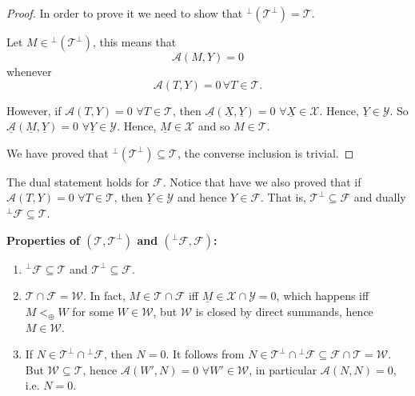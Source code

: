 \begin{proof}
  In order to prove it we need to show that $^\perp(\mathcal{T}^\perp) = \mathcal{T}$.

  Let $M\in {^\perp(\mathcal{T}^\perp)}$, this means that
  \begin{equation}
    \mathcal{A}(M,Y) = 0
  \end{equation}
  whenever
  \begin{equation}
    \mathcal{A}(T,Y) = 0\,\forall T\in\mathcal{T}.
  \end{equation}

  However, if $\mathcal{A}(T,Y)=0$ $\forall T\in\mathcal{T}$, then $\underline{\mathcal{A}}(\underline{X},\underline{Y})=0$ $\forall \underline{X}\in\mathcal{X}$. Hence, $\underline{Y}\in\mathcal{Y}$.
  So $\underline{\mathcal{A}}(\underline{M},\underline{Y})=0$ $\forall \underline{Y}\in\mathcal{Y}$. Hence, $\underline{M}\in\mathcal{X}$ and so $M\in\mathcal{T}$.

  We have proved that $^\perp(\mathcal{T}^\perp) \subseteq \mathcal{T}$, the converse inclusion is trivial.
\end{proof}

\begin{rmk}
  The dual statement holds for $\mathcal{F}$. Notice that have we also proved that if $\mathcal{A}(T,Y)=0$ $\forall T\in\mathcal{T}$, then $\underline{Y}\in\mathcal{Y}$ and hence $Y\in\mathcal{F}$. That is, $\mathcal{T}^\perp \subseteq \mathcal{F}$ and dually $^\perp\mathcal{F}\subseteq \mathcal{T}$.
\end{rmk}

\sepline

\bf Properties of $(\mathcal{T},\mathcal{T}^\perp)$ and $(^\perp\mathcal{F},\mathcal{F})$: \rm
\begin{enumerate}
  \item $^\perp\mathcal{F}\subseteq\mathcal{T}$ and $\mathcal{T}^\perp\subseteq \mathcal{F}$.
  \item $\mathcal{T}\cap\mathcal{F} = \mathcal{W}$.
  In fact, $M\in\mathcal{T}\cap\mathcal{F}$ iff $\underline{M}\in\mathcal{X}\cap\mathcal{Y}=0$, which happens iff $M<_\oplus W$ for some $W\in\mathcal{W}$,
  but $\mathcal{W}$ is closed by direct summands, hence $M\in\mathcal{W}$.
  \item If $N\in\mathcal{T}^\perp \cap{^\perp\mathcal{F}}$, then $N=0$. It follows from $N\in\mathcal{T}^\perp \cap{^\perp\mathcal{F}}\subseteq\mathcal{F}\cap\mathcal{T}=\mathcal{W}$. But $\mathcal{W}\subseteq\mathcal{T}$, hence $\mathcal{A}(W',N)=0$ $\forall W'\in\mathcal{W}$,
  in particular $\mathcal{A}(N,N)=0$, i.e. $N=0$.
\end{enumerate}

